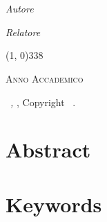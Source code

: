\documentclass[12pt,a4paper,twoside,openright,english]{book}
\begin{document}
\begin{titlepage}
\begin{center}
		\LARGE{\textsc{\textbf{\myTitle}}}\\
		\large{\mySubTitle}\\
		\vfill
		\begin{minipage}{0.4\textwidth}
			\begin{flushleft} \large
				\emph{Autore}\\
				\myName
			\end{flushleft}
		\end{minipage}
		\hfill
		\begin{minipage}{0.4\textwidth}
			\begin{flushright} \large
				\emph{Relatore} \\
				\myProf
			\end{flushright}
		\end{minipage}
		\vfill
		\line(1, 0){338} \\
		\begin{normalsize}
			\textsc{Anno Accademico \myAA}
		\end{normalsize}
	\end{center}
\end{titlepage}

\thispagestyle{empty}
\hfill
\vfill
\noindent \myName\ \textit{\myTitle,} \myDegree, Copyright \textcopyright\ \myTime.

\cleardoublepage

\chapter*{Abstract}\label{abstract}

\chapter*{Keywords}\label{keywords}

\tableofcontents
\listoffigures
\listoftables

\mainmatter
\end{document}
